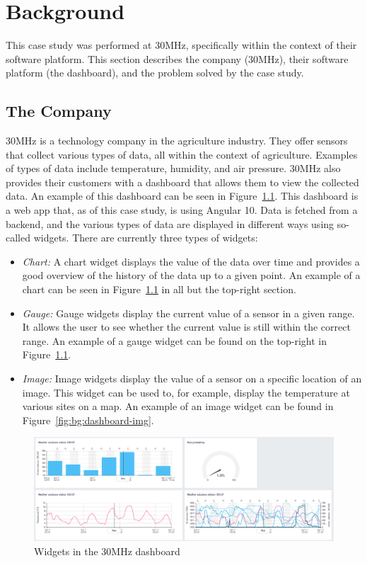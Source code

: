 \chapter{Background}\label{chap:background}

This case study was performed at 30MHz, specifically within the context of their software platform. This section describes the company (30MHz), their software platform (the dashboard), and the problem solved by the case study.

\section{The Company}\label{sec:bg:thecompany}
30MHz is a technology company in the agriculture industry. They offer sensors that collect various types of data, all within the context of agriculture. Examples of types of data include temperature, humidity, and air pressure. 30MHz also provides their customers with a dashboard that allows them to view the collected data. An example of this dashboard can be seen in Figure~\ref{fig:bg:dashboard}. This dashboard is a web app that, as of this case study, is using Angular 10. Data is fetched from a backend, and the various types of data are displayed in different ways using so-called widgets. There are currently three types of widgets:

\begin{itemize}
  \item \emph{Chart:} A chart widget displays the value of the data over time and provides a good overview of the history of the data up to a given point. An example of a chart can be seen in Figure~\ref{fig:bg:dashboard} in all but the top-right section.
  \item \emph{Gauge:} Gauge widgets display the current value of a sensor in a given range. It allows the user to see whether the current value is still within the correct range. An example of a gauge widget can be found on the top-right in Figure~\ref{fig:bg:dashboard}.
  \item \emph{Image:} Image widgets display the value of a sensor on a specific location of an image. This widget can be used to, for example, display the temperature at various sites on a map. An example of an image widget can be found in Figure~\ref{fig:bg:dashboard-img}.
\end{itemize}

\begin{figure}[h]
  \includegraphics[width=\columnwidth]{figures/background/dashboard.png}
  \caption{Widgets in the 30MHz dashboard}
  \label{fig:bg:dashboard}
  \centering
\end{figure}

